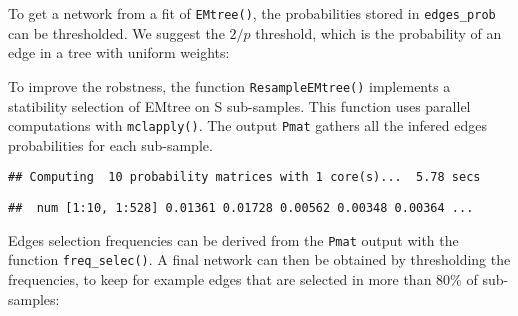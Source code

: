 To get a network from a fit of \texttt{EMtree()}, the probabilities
stored in \texttt{edges\_prob} can be thresholded. We suggest the
$2/p$ threshold, which is the probability of an edge in a tree with uniform weights:

\begin{Shaded}
\begin{Highlighting}[]
\StringTok{ }\OperatorTok{\$}
\OperatorTok{*}\OperatorTok{>}\OperatorTok{/}
\end{Highlighting}
\end{Shaded}

To improve the robstness, the function \texttt{ResampleEMtree()}
implements a statibility selection of EMtree on S sub-samples. This
function uses parallel computations with \texttt{mclapply()}. The output
\texttt{Pmat} gathers all the infered edges probabilities for each
sub-sample.

\begin{Shaded}
\begin{Highlighting}[]
\NormalTok{(}\OperatorTok{\$}
\NormalTok{, }\NormalTok{,}\NormalTok{, }\NormalTok{)}
\end{Highlighting}
\end{Shaded}

\begin{verbatim}
## Computing  10 probability matrices with 1 core(s)...  5.78 secs
\end{verbatim}

\begin{Shaded}
\begin{Highlighting}[]
\OperatorTok{\$}
\end{Highlighting}
\end{Shaded}

\begin{verbatim}
##  num [1:10, 1:528] 0.01361 0.01728 0.00562 0.00348 0.00364 ...
\end{verbatim}

Edges selection frequencies can be derived from the \texttt{Pmat} output
with the function \texttt{freq\_selec()}. A final network can then be
obtained by thresholding the frequencies, to keep for example edges that
are selected in more than $80\%$ of sub-samples:

